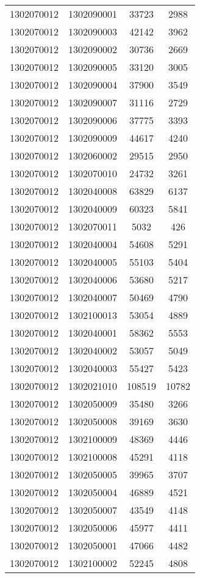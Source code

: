 \begin{longtable}[h]{llcc}
		1302070012 & 1302090001 & 33723 & 2988\\
		1302070012 & 1302090003 & 42142 & 3962\\
		1302070012 & 1302090002 & 30736 & 2669\\
		1302070012 & 1302090005 & 33120 & 3005\\
		1302070012 & 1302090004 & 37900 & 3549\\
		1302070012 & 1302090007 & 31116 & 2729\\
		1302070012 & 1302090006 & 37775 & 3393\\
		1302070012 & 1302090009 & 44617 & 4240\\
		1302070012 & 1302060002 & 29515 & 2950\\
		1302070012 & 1302070010 & 24732 & 3261\\
		1302070012 & 1302040008 & 63829 & 6137\\
		1302070012 & 1302040009 & 60323 & 5841\\
		1302070012 & 1302070011 & 5032 & 426\\
		1302070012 & 1302040004 & 54608 & 5291\\
		1302070012 & 1302040005 & 55103 & 5404\\
		1302070012 & 1302040006 & 53680 & 5217\\
		1302070012 & 1302040007 & 50469 & 4790\\
		1302070012 & 1302100013 & 53054 & 4889\\
		1302070012 & 1302040001 & 58362 & 5553\\
		1302070012 & 1302040002 & 53057 & 5049\\
		1302070012 & 1302040003 & 55427 & 5423\\
		1302070012 & 1302021010 & 108519 & 10782\\
		1302070012 & 1302050009 & 35480 & 3266\\
		1302070012 & 1302050008 & 39169 & 3630\\
		1302070012 & 1302100009 & 48369 & 4446\\
		1302070012 & 1302100008 & 45291 & 4118\\
		1302070012 & 1302050005 & 39965 & 3707\\
		1302070012 & 1302050004 & 46889 & 4521\\
		1302070012 & 1302050007 & 43549 & 4148\\
		1302070012 & 1302050006 & 45977 & 4411\\
		1302070012 & 1302050001 & 47066 & 4482\\
		1302070012 & 1302100002 & 52245 & 4808\\

\end{longtable}
